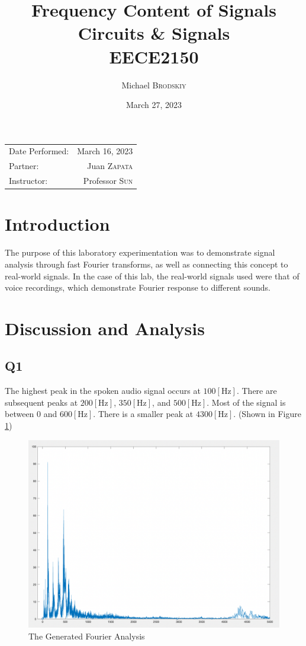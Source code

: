 \documentclass[
	letterpaper, %
	10pt, %
]{CSUniSchoolLabReport}
\title{Frequency Content of Signals\\ Circuits \& Signals \\ EECE2150} %
\author{Michael \textsc{Brodskiy}}
\date{March 27, 2023} %
\begin{document}
\maketitle %

\begin{center}
	\begin{tabular}{l r}
		Date Performed: & March 16, 2023 \\ %
        Partner: & Juan \textsc{Zapata} \\ %
		Instructor: & Professor \textsc{Sun} %
	\end{tabular}
\end{center}

\setcounter{section}{-1}

\section{Introduction}

The purpose of this laboratory experimentation was to demonstrate signal analysis through fast Fourier transforms, as well as connecting this concept to real-world signals. In the case of this lab, the real-world signals used were that of voice recordings, which demonstrate Fourier response to different sounds.

\section{Discussion and Analysis}

\subsection{Q1} The highest peak in the spoken audio signal occurs at $100[\si{\hertz}]$. There are subsequent peaks at $200[\si{\hertz}]$, $350[\si{\hertz}]$, and $500[\si{\hertz}]$. Most of the signal is between $0$ and $600[\si{\hertz}]$. There is a smaller peak at $4300[\si{\hertz}]$. (Shown in Figure \ref{fig:1})

\begin{figure}[H]
  \centering
  \includegraphics[width=.9\textwidth]{Figures/L12Q1.png}
  \caption{The Generated Fourier Analysis}
  \label{fig:1}
\end{figure}
\end{document}
